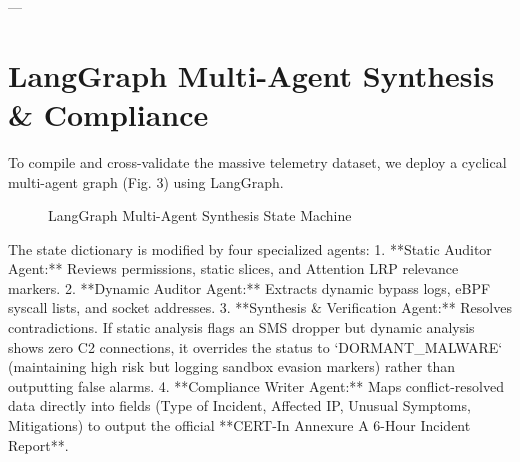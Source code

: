 \documentclass[conference]{IEEEtran}
\begin{document}
---

\section{LangGraph Multi-Agent Synthesis \& Compliance}
To compile and cross-validate the massive telemetry dataset, we deploy a cyclical multi-agent graph (Fig. 3) using LangGraph.

\begin{figure}[h]
\centering
{}
\caption{LangGraph Multi-Agent Synthesis State Machine}
\label{fig:langgraph}
\end{figure}

The state dictionary is modified by four specialized agents:
1. **Static Auditor Agent:** Reviews permissions, static slices, and Attention LRP relevance markers.
2. **Dynamic Auditor Agent:** Extracts dynamic bypass logs, eBPF syscall lists, and socket addresses.
3. **Synthesis \& Verification Agent:** Resolves contradictions. If static analysis flags an SMS dropper but dynamic analysis shows zero C2 connections, it overrides the status to `DORMANT_MALWARE` (maintaining high risk but logging sandbox evasion markers) rather than outputting false alarms.
4. **Compliance Writer Agent:** Maps conflict-resolved data directly into fields (Type of Incident, Affected IP, Unusual Symptoms, Mitigations) to output the official **CERT-In Annexure A 6-Hour Incident Report**.
\end{document}
